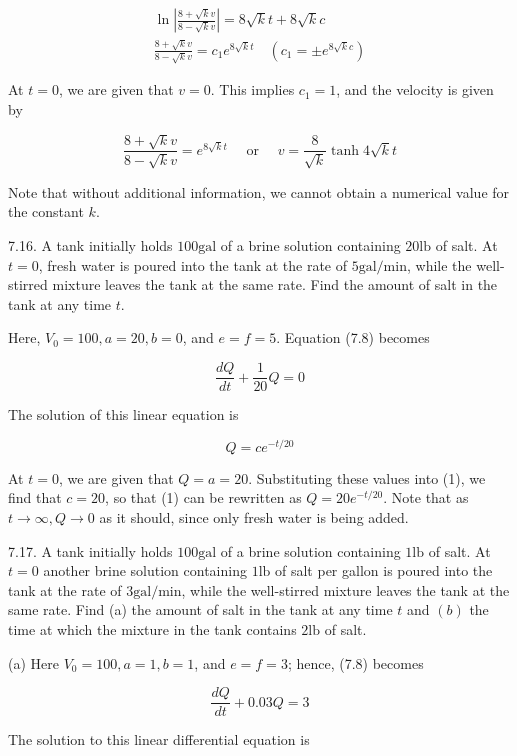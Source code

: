 \documentclass[10pt]{article}
\begin{document}
$$
\begin{gathered}
\ln \left|\frac{8+\sqrt{k} v}{8-\sqrt{k} v}\right|=8 \sqrt{k} t+8 \sqrt{k} c \\
\frac{8+\sqrt{k} v}{8-\sqrt{k} v}=c_{1} e^{8 \sqrt{k} t} \quad\left(c_{1}= \pm e^{8 \sqrt{k} c}\right)
\end{gathered}
$$

At $t=0$, we are given that $v=0$. This implies $c_{1}=1$, and the velocity is given by

$$
\frac{8+\sqrt{k} v}{8-\sqrt{k} v}=e^{8 \sqrt{k} t} \quad \text { or } \quad v=\frac{8}{\sqrt{k}} \tanh 4 \sqrt{k} t
$$

Note that without additional information, we cannot obtain a numerical value for the constant $k$.

7.16. A tank initially holds $100 \mathrm{gal}$ of a brine solution containing $20 \mathrm{lb}$ of salt. At $t=0$, fresh water is poured into the tank at the rate of $5 \mathrm{gal} / \mathrm{min}$, while the well-stirred mixture leaves the tank at the same rate. Find the amount of salt in the tank at any time $t$.

Here, $V_{0}=100, a=20, b=0$, and $e=f=5$. Equation (7.8) becomes

$$
\frac{d Q}{d t}+\frac{1}{20} Q=0
$$

The solution of this linear equation is


\begin{equation*}
Q=c e^{-t / 20} \tag{1}
\end{equation*}


At $t=0$, we are given that $Q=a=20$. Substituting these values into (1), we find that $c=20$, so that (1) can be rewritten as $Q=20 e^{-t / 20}$. Note that as $t \rightarrow \infty, Q \rightarrow 0$ as it should, since only fresh water is being added.

7.17. A tank initially holds $100 \mathrm{gal}$ of a brine solution containing $1 \mathrm{lb}$ of salt. At $t=0$ another brine solution containing $1 \mathrm{lb}$ of salt per gallon is poured into the tank at the rate of $3 \mathrm{gal} / \mathrm{min}$, while the well-stirred mixture leaves the tank at the same rate. Find (a) the amount of salt in the tank at any time $t$ and $(b)$ the time at which the mixture in the tank contains $2 \mathrm{lb}$ of salt.

(a) Here $V_{0}=100, a=1, b=1$, and $e=f=3$; hence, (7.8) becomes

$$
\frac{d Q}{d t}+0.03 Q=3
$$

The solution to this linear differential equation is
\end{document}
